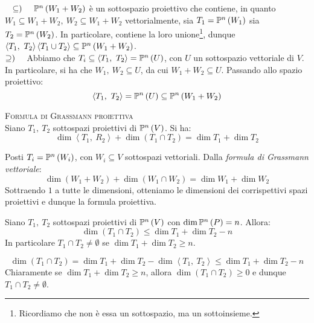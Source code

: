 \begin{demonstration}~{}
	$\subseteq)\quad$ $\proj{W_1+W_2}$ è un sottospazio proiettivo che contiene, in quanto $W_1\subseteq W_1+W_2,\ W_2\subseteq W_1+W_2$ vettorialmente, sia $T_1=\proj{W_1}$ sia $T_2=\proj{W_2}$. In particolare, contiene la loro unione\footnote{Ricordiamo che non è essa un sottospazio, ma un sottoinsieme.}, dunque $\left<T_1,\ T_2\right>\left<T_1\cup T_2\right>\subseteq \proj{W_1+W_2}$.\\
	$\supseteq)\quad$ Abbiamo che $T_i\subseteq \left<T_1,\ T_2\right>=\proj{U}$, con $U$ un sottospazio vettoriale di $V$. In particolare, si ha che $W_1,\ W_2\subseteq U$, da cui $W_1+W_2\subseteq U$. Passando allo spazio proiettivo:
	\begin{equation*}
		\left<T_1,\ T_2\right>=\proj{U}\subseteq \proj{W_1+W_2}
	\end{equation*}
\end{demonstration}
\begin{proposition}\textsc{Formula di Grassmann proiettiva}\\
	Siano $T_1,\ T_2$ sottospazi proiettivi di $\proj{V}$. Si ha:
	\begin{equation}
				\dim\left<T_1,\ R_2\right>+\dim\left(T_1\cap T_2\right)=\dim T_1+\dim T_2
	\end{equation}
\end{proposition}
\begin{demonstration}
	Posti $T_i=\proj{W_i}$, con $W_i\subseteq V$ sottospazi vettoriali. Dalla \textit{formula di Grassmann vettoriale}:
	\begin{equation*}
		\dim\left(W_1+W_2\right)+\dim\left(W_1\cap W_2\right)=\dim W_1+\dim W_2
	\end{equation*}
Sottraendo $1$ a tutte le dimensioni, otteniamo le dimensioni dei corrispettivi spazi proiettivi e dunque la formula proiettiva.
\end{demonstration}
\begin{corollary}
	Siano $T_1,\ T_2$ sottospazi proiettivi di $\proj{V}$ con $\dim\proj{P}=n$. Allora:
	\begin{equation}
		\dim \left(T_1\cap T_2\right)\leq \dim T_1+\dim T_2-n
	\end{equation}
In particolare $T_1\cap T_2\neq \emptyset$ se $\dim T_1+\dim T_2\geq n$.
\end{corollary}
\begin{demonstration}
	\begin{equation*}
		\dim\left(T_1\cap T_2\right)=\dim T_1+\dim T_2-\dim\left<T_1,\ T_2\right>\leq \dim T_1+\dim T_2-n
	\end{equation*}
Chiaramente se $\dim T_1+\dim T_2\geq n$, allora $\dim \left(T_1\cap T_2\right)\geq 0$ e dunque $T_1\cap T_2\neq \emptyset$.
\end{demonstration}
